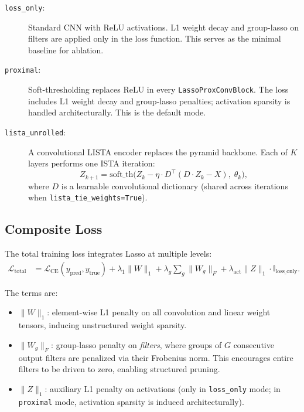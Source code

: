 \documentclass{article}
\begin{document}
\begin{description}
    \item[\texttt{loss\_only}:] Standard CNN with ReLU activations. L1 weight
        decay and group-lasso on filters are applied only in the loss function.
        This serves as the minimal baseline for ablation.
    \item[\texttt{proximal}:] Soft-thresholding replaces ReLU in every
        \texttt{LassoProxConvBlock}. The loss includes L1 weight decay and
        group-lasso penalties; activation sparsity is handled architecturally.
        This is the default mode.
    \item[\texttt{lista\_unrolled}:] A convolutional LISTA encoder replaces
        the pyramid backbone. Each of $K$ layers performs one ISTA iteration:
        \begin{equation}
            Z_{k+1} = \text{soft\_th}\bigl(Z_k - \eta \cdot D^\top (D \cdot Z_k - X),\; \theta_k\bigr),
        \end{equation}
        where $D$ is a learnable convolutional dictionary (shared across
        iterations when \texttt{lista\_tie\_weights=True}).
\end{description}

\subsection{Composite Loss}

The total training loss integrates Lasso at multiple levels:
\begin{align}
    \mathcal{L}_{\text{total}} &=
    \mathcal{L}_{\text{CE}}(y_{\text{pred}}, y_{\text{true}})
    + \lambda_1 \|W\|_1
    + \lambda_g \sum_g \|W_g\|_F
    + \lambda_{\text{act}} \|Z\|_1 \cdot \mathbb{I}_{\text{loss\_only}}.
    \label{eq:loss}
\end{align}

The terms are:
\begin{itemize}
    \item $\|W\|_1$: element-wise L1 penalty on all convolution and linear
          weight tensors, inducing unstructured weight sparsity.
    \item $\|W_g\|_F$: group-lasso penalty on \emph{filters}, where groups of
          $G$ consecutive output filters are penalized via their Frobenius norm.
          This encourages entire filters to be driven to zero, enabling
          structured pruning.
    \item $\|Z\|_1$: auxiliary L1 penalty on activations (only in
          \texttt{loss\_only} mode; in \texttt{proximal} mode, activation
          sparsity is induced architecturally).
\end{itemize}
\end{document}
